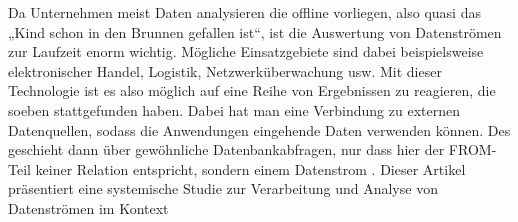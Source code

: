 Da Unternehmen meist Daten analysieren die offline vorliegen, also quasi das „Kind schon in den Brunnen gefallen ist“, ist die Auswertung von Datenströmen zur Laufzeit enorm wichtig. Mögliche Einsatzgebiete sind dabei beispielsweise elektronischer Handel, Logistik, Netzwerküberwachung usw. 
Mit dieser Technologie ist es also möglich auf eine Reihe von Ergebnissen zu reagieren, die soeben stattgefunden haben. Dabei hat man eine Verbindung zu externen Datenquellen, sodass die Anwendungen eingehende Daten verwenden können. Des geschieht dann über gewöhnliche Datenbankabfragen, nur dass hier der FROM-Teil keiner Relation entspricht, sondern einem Datenstrom \cite{Klein.2017}.
Dieser Artikel präsentiert eine systemische Studie zur Verarbeitung und Analyse von Datenströmen im Kontext

